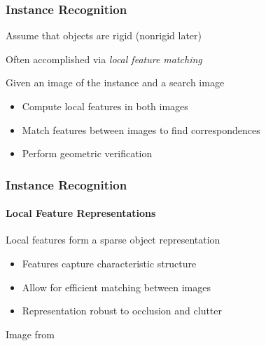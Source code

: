 \documentclass[xetex,professionalfont]{beamer}
\begin{document}
\begin{frame}
\frametitle{Instance Recognition}

Assume that objects are rigid (nonrigid later) %

\bigskip
Often accomplished via \emph{local feature matching}

\bigskip
Given an image of the instance and a search image
\begin{itemize}
    \item Compute local features in both images
    \item Match features between images to find correspondences
    \item Perform geometric verification
\end{itemize}

\end{frame}


\begin{frame}
\frametitle{Instance Recognition}
\framesubtitle{Local Feature Representations}

Local features form a sparse object representation
\begin{itemize}
    \item Features capture characteristic structure
    \item Allow for efficient matching between images
    \item Representation robust to occlusion and clutter %
\end{itemize}

\begin{center}
    {\centering Image from \cite{grauman2011}}
\end{center}

\end{frame}

\end{document}
